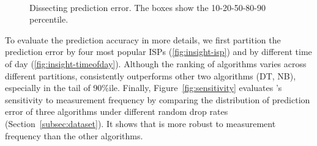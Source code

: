 \begin{figure}[t!]
\centering
\\
\caption{Dissecting \name prediction error. The boxes show the 10-20-50-80-90 percentile.}
\label{fig:insight}
\end{figure}

 To evaluate the prediction accuracy in more details, we first partition the prediction error by four most popular ISPs (\ref{fig:insight-isp}) and by different time of day (\ref{fig:insight-timeofday}). Although the ranking of algorithms varies across different partitions, \name consistently outperforms other two algorithms (DT, NB), especially in the tail of 90\%ile. Finally, Figure~\ref{fig:sensitivity} evaluates \name's sensitivity to measurement frequency by comparing the distribution of prediction error of three algorithms under different random drop rates (Section~\ref{subsec:dataset}). It shows that \name is more robust to measurement frequency than the other algorithms.

